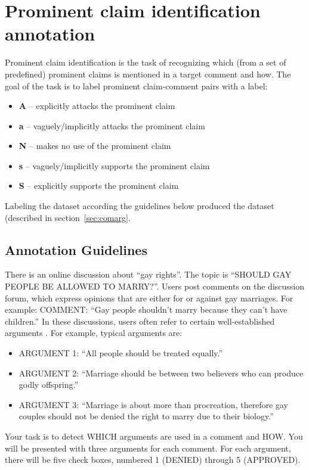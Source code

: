 \section{Prominent claim identification annotation}
\label{sec:argrec_annotation}

Prominent claim identification is the task of recognizing which (from a set of
predefined) prominent claims is mentioned in a target comment and how. The goal
of the task is to label prominent claim-comment pairs with a label:
\begin{itemize}
	\item \textbf{A} -- explicitly attacks the prominent claim
	\item \textbf{a} -- vaguely/implicitly attacks the prominent claim
	\item \textbf{N} -- makes no use of the prominent claim
	\item \textbf{s} -- vaguely/implicitly supports the prominent claim
	\item \textbf{S} -- explicitly supports the prominent claim
\end{itemize}
Labeling the dataset according the guidelines below
produced the \ComArg dataset (described in section~\ref{sec:comarg}.

\subsection*{Annotation Guidelines}

There is an online discussion about ``gay rights''. The topic is ``SHOULD GAY
PEOPLE BE ALLOWED TO MARRY?''. Users post comments on the discussion forum,
which express opinions that are either for or against gay marriages. For
example: COMMENT: ``Gay people shouldn’t marry because they can’t have
children.''
In these discussions, users often refer to certain well-established arguments .
For example, typical arguments are:
\begin{itemize}
\item ARGUMENT 1: ``All people should be treated equally.''
\item ARGUMENT 2: ``Marriage should be between two believers who can produce godly offspring.''
\item ARGUMENT 3: ``Marriage is about more than procreation, therefore gay couples should not be denied the right to marry due to their biology.''
\end{itemize}

\noindent Your task is to detect WHICH arguments are used in a comment and HOW. You will
be presented with three arguments for each comment. For each argument, there
will be five check boxes, numbered 1 (DENIED) through 5 (APPROVED). 

